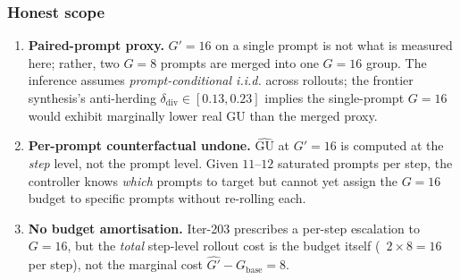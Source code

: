 \subsubsection*{Honest scope}

\begin{enumerate}
\item \textbf{Paired-prompt proxy.}  $G'=16$ on a single prompt is not what
is measured here; rather, two $G=8$ prompts are merged into one $G=16$
group.  The inference assumes \emph{prompt-conditional i.i.d.} across rollouts;
the frontier synthesis's anti-herding $\delta_{\text{div}} \in [0.13, 0.23]$
implies the single-prompt $G=16$ would exhibit marginally lower real $\mathrm{GU}$
than the merged proxy.
\item \textbf{Per-prompt counterfactual undone.}  $\widehat{\mathrm{GU}}$ at
$G'=16$ is computed at the \emph{step} level, not the prompt level.  Given
$11$–$12$ saturated prompts per step, the controller knows \emph{which}
prompts to target but cannot yet assign the $G=16$ budget to specific
prompts without re-rolling each.
\item \textbf{No budget amortisation.}  Iter-203 prescribes a per-step
escalation to $G=16$, but the \emph{total} step-level rollout cost is the
budget itself (~$2 \times 8 = 16$ per step), not the marginal cost
$\widehat{G'} - G_{\text{base}} = 8$.
\end{enumerate}
